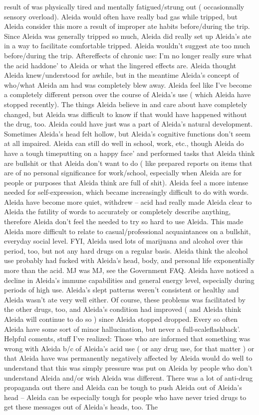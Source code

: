 \documentclass[12pt]{book}
\begin{document}
result of was physically tired and mentally fatigued/strung out ( occasionnally sensory overload). Aleida would often have really bad gas while tripped, but Aleida consider this more a result of improper ate habits before/during the trip. Since Aleida was generally tripped so much, Aleida did really set up Aleida's ate in a way to facilitate comfortable tripped. Aleida wouldn't suggest ate too much before/during the trip. Aftereffects of chronic use: I'm no longer really sure what the acid haddone' to Aleida or what the lingered effects are. Aleida thought Aleida knew/understood for awhile, but in the meantime Aleida's concept of who/what Aleida am had was completely blew away. Aleida feel like I've become a completely different person over the course of Aleida's use ( which Aleida have stopped recently). The things Aleida believe in and care about have completely changed, but Aleida was difficult to know if that would have happened without the drug, too. Aleida could have just was a part of Aleida's natural development. Sometimes Aleida's head felt hollow, but Aleida's cognitive functions don't seem at all impaired. Aleida can still do well in school, work, etc., though Aleida do have a tough timeputting on a happy face' and performed tasks that Aleida think are bullshit or that Aleida don't want to do ( like prepared reports on items that are of no personal significance for work/school, especially when Aleida are for people or purposes that Aleida think are full of shit). Aleida feel a more intense needed for self-expression, which became increasingly difficult to do with words. Aleida have become more quiet, withdrew -- acid had really made Aleida clear to Aleida the futility of words to accurately or completely describe anything, therefore Aleida don't feel the needed to try so hard to use Aleida. This made Aleida more difficult to relate to casual/professional acquaintances on a bullshit, everyday social level. FYI, Aleida used lots of marijuana and alcohol over this period, too, but not any hard drugs on a regular basis. Aleida think the alcohol use probably had fucked with Aleida's head, body, and personal life exponentially more than the acid. MJ was MJ, see the Government FAQ. Aleida have noticed a decline in Aleida's immune capabilities and general energy level, especially during periods of high use. Aleida's slept patterns weren't consistent or healthy and Aleida wasn't ate very well either. Of course, these problems was facilitated by the other drugs, too, and Aleida's condition had improved ( and Aleida think Aleida will continue to do so ) since Aleida stopped dropped. Every so often Aleida have some sort of minor hallucination, but never a full-scaleflashback'. Helpful coments, stuff I've realized: Those who are informed that something was wrong with Aleida b/c of Aleida's acid use ( or any drug use, for that matter ) or that Aleida have was permanently negatively affected by Aleida would do well to understand that this was simply pressure was put on Aleida by people who don't understand Aleida and/or wish Aleida was different. There was a lot of anti-drug propaganda out there and Aleida can be tough to push Aleida out of Aleida's head -- Aleida can be especially tough for people who have never tried drugs to get these messages out of Aleida's heads, too. The 
\end{document}
